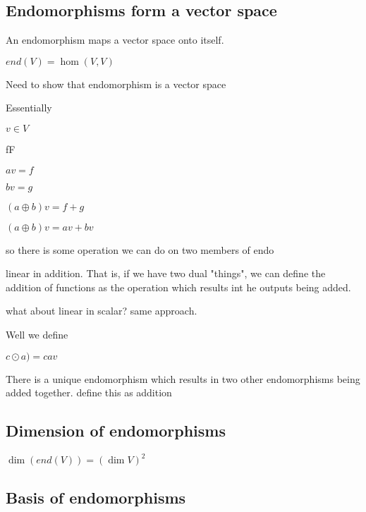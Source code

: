
\subsection{Endomorphisms form a vector space}

An endomorphism maps a vector space onto itself.

\( end (V)=\hom (V, V)\)

Need to show that endomorphism is a vector space

Essentially

\(v\in V\)

f\in F\)

\(av = f\)

\(bv = g\)


\((a\oplus b)v=f+g\)

\((a\oplus b)v=av + bv\)

so there is some operation we can do on two members of endo

linear in addition. That is, if we have two dual "things", we can define the addition of functions as the operation which results int he outputs being added.

what about linear in scalar? same approach.

Well we define 

\(c\odot a)=cav\)

There is a unique endomorphism which results in two other endomorphisms being added together. define this as addition
\subsection{Dimension of endomorphisms}

\(\dim (end(V))=(\dim V )^2\)

\subsection{Basis of endomorphisms}

